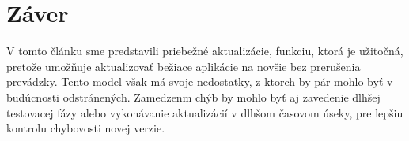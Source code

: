 \documentclass[10pt,twoside,slovak,a4paper]{article}
\begin{document}
\section{Záver}\label{3}
V tomto článku sme predstavili priebežné aktualizácie, funkciu, ktorá je užitočná, pretože umožňuje aktualizovať bežiace aplikácie na novšie  bez prerušenia prevádzky. Tento model však má svoje nedostatky, z ktorch by pár mohlo byť v budúcnosti odstránených. Zamedzenm chýb by mohlo byť aj zavedenie dlhšej testovacej fázy alebo vykonávanie aktualizácií v dlhšom časovom úseky, pre lepšiu kontrolu chybovosti novej verzie. 



\end{document}
